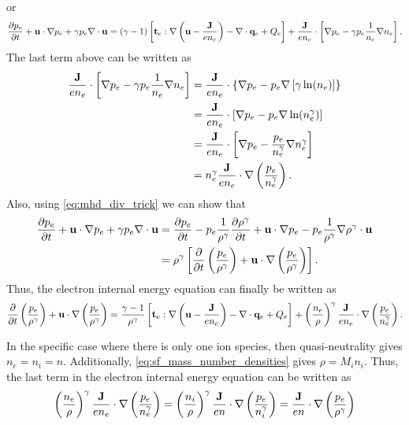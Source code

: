 \documentclass[a4paper,11pt]{report}
\begin{document}
or
\begin{equation*}
    \frac{\partial p_e}{\partial t} + \mathbf{u} \cdot \nabla p_e + \gamma p_e \nabla \cdot \mathbf{u} = (\gamma - 1) \left[ \mathbf{t}_e : \nabla \left( \mathbf{u} - \frac{\mathbf{J}}{en_e} \right) - \nabla \cdot \mathbf{q}_e + Q_e \right] + \frac{\mathbf{J}}{e n_e} \cdot \left[ \nabla p_e - \gamma p_e \frac{1}{n_e} \nabla n_e \right],
\end{equation*} 
The last term above can be written as
\begin{align*}
    \frac{\mathbf{J}}{e n_e} \cdot \left[ \nabla p_e - \gamma p_e \frac{1}{n_e} \nabla n_e \right] &= \frac{\mathbf{J}}{e n_e} \cdot \left\{ \nabla p_e - p_e \nabla \left[\gamma \ln (n_e) \right] \right\} \\
    &= \frac{\mathbf{J}}{e n_e} \cdot \left[ \nabla p_e - p_e \nabla \ln (n_e^\gamma) \right] \\
    &= \frac{\mathbf{J}}{e n_e} \cdot \left[ \nabla p_e - \frac{p_e}{n_e^\gamma} \nabla n_e^\gamma \right] \\
    &= n_e^\gamma \frac{\mathbf{J}}{e n_e} \cdot \nabla \left( \frac{p_e}{n_e^\gamma} \right).
\end{align*}
Also, using \cref{eq:mhd_div_trick} we can show that
\begin{align*}
    \frac{\partial p_e}{\partial t} + \mathbf{u} \cdot \nabla p_e + \gamma p_e \nabla \cdot \mathbf{u} 
    &=  \frac{\partial p_e}{\partial t} - p_e \frac{1}{\rho^\gamma} \frac{\partial \rho^\gamma}{\partial t} + \mathbf{u} \cdot \nabla p_e - p_e \frac{1}{\rho^\gamma} \nabla \rho^\gamma \cdot \mathbf{u} \nonumber \\
    & = \rho^\gamma \left [ \frac{\partial}{\partial t} \left( \frac{p_e}{\rho^\gamma} \right) + \mathbf{u} \cdot \nabla \left(\frac{p_e}{\rho^\gamma} \right) \right ].
\end{align*}
Thus, the electron internal energy equation can finally be written as
\begin{equation*}
    \frac{\partial}{\partial t} \left( \frac{p_e}{\rho^\gamma} \right) + \mathbf{u} \cdot \nabla \left(\frac{p_e}{\rho^\gamma} \right) = \frac{\gamma - 1}{\rho^\gamma} \left[ \mathbf{t}_e : \nabla \left( \mathbf{u} - \frac{\mathbf{J}}{en_e} \right) - \nabla \cdot \mathbf{q}_e + Q_e \right] + \left( \frac{n_e}{\rho} \right)^\gamma \frac{\mathbf{J}}{e n_e} \cdot \nabla \left( \frac{p_e}{n_e^\gamma} \right).
\end{equation*}

In the specific case where there is only one ion species, then quasi-neutrality gives $n_e = n_i = n$. Additionally, \cref{eq:sf_mass_number_densities} gives $\rho = M_i n_i$. Thus, the last term in the electron internal energy equation can be written as
\begin{equation}
    \left( \frac{n_e}{\rho} \right)^\gamma \frac{\mathbf{J}}{e n_e} \cdot \nabla \left( \frac{p_e}{n_e^\gamma} \right) = \left( \frac{n_i}{\rho} \right)^\gamma \frac{\mathbf{J}}{e n} \cdot \nabla \left( \frac{p_e}{n_i^\gamma} \right) = \frac{\mathbf{J}}{e n} \cdot \nabla \left( \frac{p_e}{\rho^\gamma} \right)
\end{equation}
\end{document}

